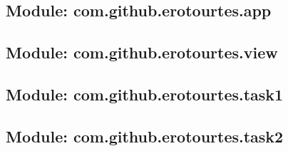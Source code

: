 \subsection{Module: com.github.erotourtes.app}


\subsection{Module: com.github.erotourtes.view}


\subsection{Module: com.github.erotourtes.task1}



\subsection{Module: com.github.erotourtes.task2}

